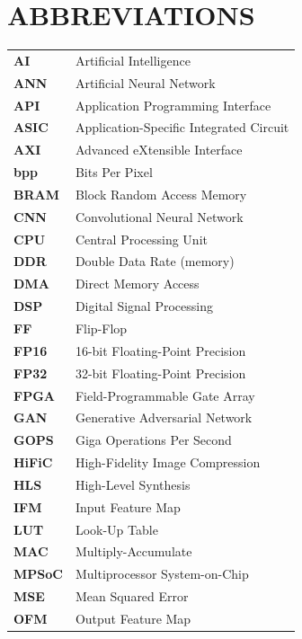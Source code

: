 \section*{ABBREVIATIONS}

\begin{center}
\begin{tabular}{p{} p{}}
\textbf{AI} & Artificial Intelligence \\
\textbf{ANN} & Artificial Neural Network \\
\textbf{API} & Application Programming Interface \\
\textbf{ASIC} & Application-Specific Integrated Circuit \\
\textbf{AXI} & Advanced eXtensible Interface \\
\textbf{bpp} & Bits Per Pixel \\
\textbf{BRAM} & Block Random Access Memory \\
\textbf{CNN} & Convolutional Neural Network \\
\textbf{CPU} & Central Processing Unit \\
\textbf{DDR} & Double Data Rate (memory) \\
\textbf{DMA} & Direct Memory Access \\
\textbf{DSP} & Digital Signal Processing \\
\textbf{FF} & Flip-Flop \\
\textbf{FP16} & 16-bit Floating-Point Precision \\
\textbf{FP32} & 32-bit Floating-Point Precision \\
\textbf{FPGA} & Field-Programmable Gate Array \\
\textbf{GAN} & Generative Adversarial Network \\
\textbf{GOPS} & Giga Operations Per Second \\
\textbf{HiFiC} & High-Fidelity Image Compression \\
\textbf{HLS} & High-Level Synthesis \\
\textbf{IFM} & Input Feature Map \\
\textbf{LUT} & Look-Up Table \\
\textbf{MAC} & Multiply-Accumulate \\
\textbf{MPSoC} & Multiprocessor System-on-Chip \\
\textbf{MSE} & Mean Squared Error \\
\textbf{OFM} & Output Feature Map \\

\end{tabular}
\end{center}
